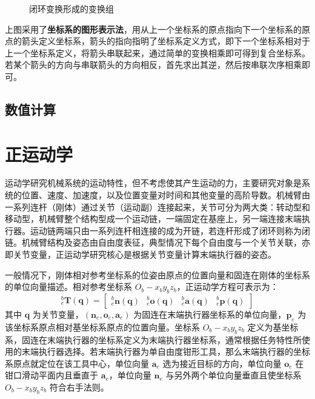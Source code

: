 \documentclass[cn,11pt,chinese,blue,bibstyle=ieeetr]{elegantbook}
\begin{document}
\begin{figure}[htbp]
	\caption{闭环变换形成的变换组}
\end{figure}

上图采用了\textbf{坐标系的图形表示法}，用从上一个坐标系的原点指向下一个坐标系的原点的箭头定义坐标系，箭头的指向指明了坐标系定义方式，即下一个坐标系相对于上一个坐标系定义，将箭头串联起来，通过简单的变换相乘即可得到复合坐标系。若某个箭头的方向与串联箭头的方向相反，首先求出其逆，然后按串联次序相乘即可。


\subsection{数值计算}


\section{正运动学}\label{direct_kinematics}

运动学研究机械系统的运动特性，但不考虑使其产生运动的力，主要研究对象是系统的位置、速度、加速度，以及位置变量对时间和其他变量的高阶导数。机械臂由一系列连杆（刚体）通过关节（运动副）连接起来，关节可分为两大类：转动型和移动型，机械臂整个结构型成一个运动链，一端固定在基座上，另一端连接末端执行器。运动链两端只由一系列连杆相连接的成为开链，若连杆形成了闭环则称为闭链。机械臂结构及姿态由自由度表征，典型情况下每个自由度与一个关节关联，亦即关节变量，正运动学研究核心是根据关节变量计算末端执行器的姿态。

一般情况下，刚体相对参考坐标系的位姿由原点的位置向量和固连在刚体的坐标系的单位向量描述。相对参考坐标系 $O_b-x_by_bz_b$，正运动学方程可表示为：
\begin{equation}
{_e^b\bm{T}}\left(\bm{q}\right) = \begin{bmatrix}
{_e^b\bm{n}}\left(\bm{q}\right) & {_e^b\bm{o}}\left(\bm{q}\right) & {_e^b\bm{a}}\left(\bm{q}\right) & {_e^b\bm{p}}\left(\bm{q}\right)
\end{bmatrix}
\end{equation}
其中 $\bm{q}$ 为关节变量，$\left(\bm{n}_e,\bm{o}_e,\bm{a}_e\right)$ 为固连在末端执行器坐标系的单位向量，$\bm{p}_e$ 为该坐标系原点相对基坐标系原点的位置向量。坐标系 $O_b-x_by_bz_b$ 定义为基坐标系，固连在末端执行器的坐标系定义为末端执行器坐标系，通常根据任务特性所使用的末端执行器选择。若末端执行器为单自由度钳形工具，那么末端执行器的坐标系原点就定位在该工具中心，单位向量 $\bm{a}_e$ 选为接近目标的方向，单位向量 $\bm{o}_e$ 在钳口滑动平面内且垂直于 $\bm{a}_e$，单位向量 $\bm{n}_e$ 与另外两个单位向量垂直且使坐标系 $O_b-x_by_bz_b$ 符合右手法则。
\end{document}
